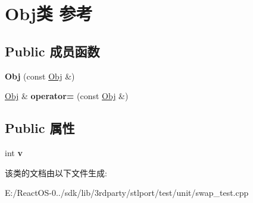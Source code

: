 \hypertarget{class_obj}{}\section{Obj类 参考}
\label{class_obj}
\subsection*{Public 成员函数}
\begin{DoxyCompactItemize}
\item 
\mbox{\label{class_obj_ac4ec3ae438b5aacc596f7e5731649591}} 
{\bfseries Obj} (const \hyperlink{class_obj}{Obj} \&)
\item 
\mbox{\label{class_obj_abeca9aa9de2469294c05d0b70d00a2b6}} 
\hyperlink{class_obj}{Obj} \& {\bfseries operator=} (const \hyperlink{class_obj}{Obj} \&)
\end{DoxyCompactItemize}
\subsection*{Public 属性}
\begin{DoxyCompactItemize}
\item 
\mbox{\label{class_obj_ae1a341aafb33881ef8e38fd68d47377e}} 
int {\bfseries v}
\end{DoxyCompactItemize}


该类的文档由以下文件生成\+:\begin{DoxyCompactItemize}
\item 
E\+:/\+React\+O\+S-\/0../sdk/lib/3rdparty/stlport/test/unit/swap\+\_\+test.\+cpp\end{DoxyCompactItemize}
